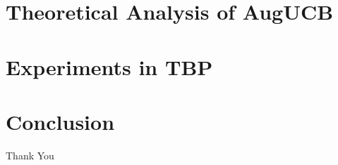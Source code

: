 \documentclass{beamer}
\begin{document}
\section{Theoretical Analysis of AugUCB}


\section{Experiments in TBP}


\section{Conclusion}


% 
%



\begin{frame}
\Huge{\centerline{Thank You}}
\end{frame}

\end{document}
